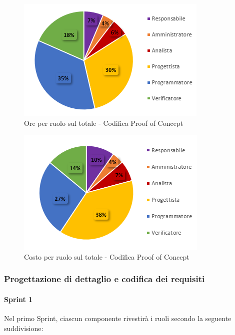 \begin{figure}[H]
  \centering
  \includegraphics[scale=1]{immagini/ore_ruolo_PoC.png}
  \caption{Ore per ruolo sul totale - Codifica Proof of Concept}
\end{figure}

\begin{figure}[H]
  \centering
  \includegraphics[scale=1]{immagini/costo_ruolo_PoC.png}
  \caption{Costo per ruolo sul totale - Codifica Proof of Concept}
\end{figure}


\subsubsection{Progettazione di dettaglio e codifica dei requisiti}
\paragraph{Sprint 1}
Nel primo Sprint\glo{}, ciascun componente rivestirà i ruoli secondo la seguente suddivisione:

